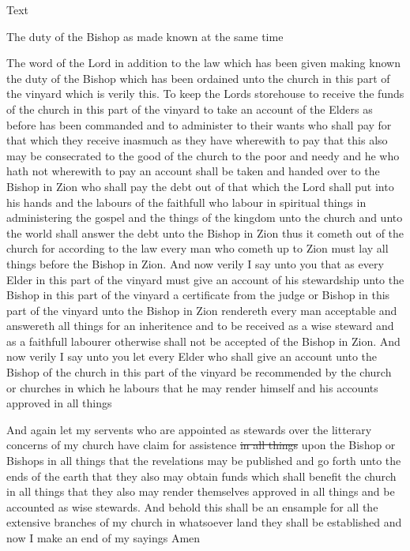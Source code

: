 {			\begin{description}
				\item[Text]
			\end{description}
			
				\begin{tightcenter}
				The duty of the Bishop as made known at the same time
				\end{tightcenter}
				
				The word of the Lord in addition to the law which has been given making known the duty of the Bishop which has been ordained unto the church in this part of the vinyard which is verily this. To keep the Lords storehouse to receive the funds of the church in this part of the vinyard to take an account of the Elders as before has been commanded and to administer to their wants who shall pay for that which they receive inasmuch as they have wherewith to pay that this also may be consecrated to the good of the church to the poor and needy and he who hath not wherewith to pay an account shall be taken and handed over to the Bishop in Zion who shall pay the debt out of that which the Lord shall put into his hands and the labours of the faithfull who labour in spiritual things in administering the gospel and the things of the kingdom unto the church and unto the world shall answer the debt unto the Bishop in Zion thus it cometh out of the church for according to the law every man who cometh up to Zion must lay all things before the Bishop in Zion. And now verily I say unto you that as every Elder in this part of the vinyard must give an account of his stewardship unto the Bishop in this part of the vinyard a certificate from the judge or Bishop in this part of the vinyard unto the Bishop in Zion rendereth every man acceptable and answereth all things for an inheritence and to be received as a wise steward and as a faithfull labourer otherwise shall not be accepted of the Bishop in Zion. And now verily I say unto you let every Elder who shall give an account unto the Bishop of the church in this part of the vinyard be recommended by the church or churches in which he labours that he may render himself and his accounts approved in all things
				
				And again let my servents who are appointed as stewards over the litterary concerns of my church have claim for assistence \sout{in all things} upon the Bishop or Bishops in all things that the revelations may be published and go forth unto the ends of the earth that they also may obtain funds which shall benefit the church in all things that they also may render themselves approved in all things and be accounted as wise stewards. And behold this shall be an ensample for all the extensive branches of my church in whatsoever land they shall be established and now I make an end of my sayings Amen
				
}
